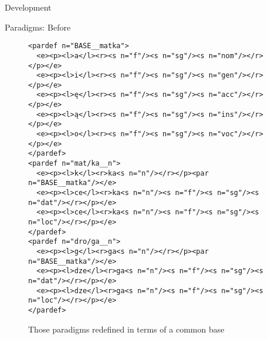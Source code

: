\documentclass{beamer}
\begin{document}
\begin{section}{Development}
\begin{frame}[fragile]{Paradigms: Before}
\begin{figure}
\begin{small}
\begin{verbatim}
<pardef n="BASE__matka">
  <e><p><l>a</l><r><s n="f"/><s n="sg"/><s n="nom"/></r></p></e>
  <e><p><l>i</l><r><s n="f"/><s n="sg"/><s n="gen"/></r></p></e>
  <e><p><l>ę</l><r><s n="f"/><s n="sg"/><s n="acc"/></r></p></e>
  <e><p><l>ą</l><r><s n="f"/><s n="sg"/><s n="ins"/></r></p></e>
  <e><p><l>o</l><r><s n="f"/><s n="sg"/><s n="voc"/></r></p></e>
</pardef>
<pardef n="mat/ka__n">
  <e><p><l>k</l><r>ka<s n="n"/></r></p><par n="BASE__matka"/></e>
  <e><p><l>ce</l><r>ka<s n="n"/><s n="f"/><s n="sg"/><s n="dat"/></r></p></e>
  <e><p><l>ce</l><r>ka<s n="n"/><s n="f"/><s n="sg"/><s n="loc"/></r></p></e>
</pardef>
<pardef n="dro/ga__n">
  <e><p><l>g</l><r>ga<s n="n"/></r></p><par n="BASE__matka"/></e>
  <e><p><l>dze</l><r>ga<s n="n"/><s n="f"/><s n="sg"/><s n="dat"/></r></p></e>
  <e><p><l>dze</l><r>ga<s n="n"/><s n="f"/><s n="sg"/><s n="loc"/></r></p></e>
</pardef>
\end{verbatim}
\end{small}
\caption{Those paradigms redefined in terms of a common base}
\end{figure}
\end{frame}

\end{section}
\end{document}
